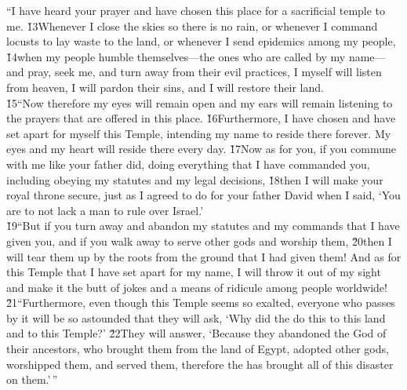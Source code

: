 \begin{poetry}
\poeml ``I have heard your prayer and have chosen this place for a sacrificial temple to me. \v{13}Whenever I close the skies so there is no rain, or whenever I command locusts to lay waste to the land, or whenever I send epidemics among my people, \v{14}when my people humble themselves---the ones who are called by my name---and pray, seek me, and turn away from their evil practices, I myself will listen from heaven, I will pardon their sins, and I will restore their land. \\
\poeml \v{15}``Now therefore my eyes will remain open and my ears will remain listening to the prayers that are offered in this place. \v{16}Furthermore, I have chosen and have set apart for myself this Temple, intending my name to reside there forever. My eyes and my heart will reside there every day. \v{17}Now as for you, if you commune with me like your father did, doing everything that I have commanded you, including obeying my statutes and my legal decisions, \v{18}then I will make your royal throne secure, just as I agreed to do for your father David when I said, `You are to not lack a man to rule over Israel.' \\
\poeml \v{19}``But if you turn away and abandon my statutes and my commands that I have given you, and if you walk away to serve other gods and worship them, \v{20}then I will tear them up by the roots from the ground that I had given them! And as for this Temple that I have set apart for my name, I will throw it out of my sight and make it the butt of jokes and a means of ridicule among people worldwide! \\
\poeml \v{21}``Furthermore, even though this Temple seems so exalted, everyone who passes by it will be so astounded that they will ask, `Why did the  do this to this land and to this Temple?' \v{22}They will answer, `Because they abandoned the  God of their ancestors, who brought them from the land of Egypt, adopted other gods, worshipped them, and served them, therefore the  has brought all of this disaster on them.'\,''
\end{poetry}

